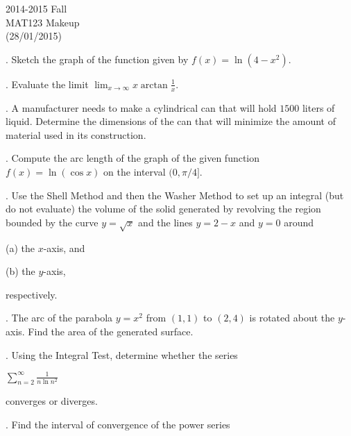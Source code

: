 \documentclass{article}
\begin{document}
\pagestyle{empty}
\large

\begin{center}
2014-2015 Fall \\MAT123 Makeup\\(28/01/2015)
\end{center}

. Sketch the graph of the function given by $f(x)=\ln\left(4-x^2\right)$.

\hfill

. Evaluate the limit $\displaystyle\lim_{x\to\infty}x\arctan\frac1x$.

\hfill

. A manufacturer needs to make a cylindrical can that will hold $1500$ liters of liquid. Determine the dimensions of the can that will minimize the amount of material used in its construction.

\hfill

. Compute the arc length of the graph of the given function $f(x)=\ln(\cos x)$ on the interval $(0,\pi/4]$.

\hfill

. Use the Shell Method and then the Washer Method to set up an integral (but do not evaluate) the volume of the solid generated by revolving the region bounded by the curve $y=\sqrt x$ and the lines $y=2-x$ and $y=0$ around

\hfill

\noindent (a) the $x$-axis, and

\hfill

\noindent (b) the $y$-axis,

\hfill

\noindent respectively.

\hfill

. The arc of the parabola $y=x^2$ from $(1,1)$ to $(2,4)$ is rotated about the $y$-axis. Find the area of the generated surface. 

\hfill

. Using the Integral Test, determine whether the series

\hfill

\noindent $\displaystyle\sum_{n=2}^{\infty}\frac1{n\ln n^2}$

\hfill

\noindent converges or diverges.

\hfill

. Find the interval of convergence of the power series
\end{document}
